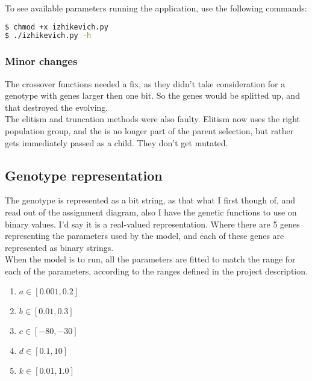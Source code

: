 To see available parameters running the application, use the following commands:

\begin{lstlisting}[frame=single,caption={Application usage},language=bash] 
$ chmod +x izhikevich.py
$ ./izhikevich.py -h
\end{lstlisting}

\subsubsection{Minor changes}
\label{sec:geneticchanges}

The crossover functions needed a fix, as they didn't take consideration for a genotype with genes larger
then one bit. So the genes would be splitted up, and that destroyed the evolving. \\

The elitism and truncation methods were also faulty. Elitism now uses the right population group, and the
is no longer part of the parent selection, but rather gets immediately passed as a child. They don't get mutated. 


\subsection{Genotype representation}
\label{sec:genotype}

The genotype is represented as a bit string, as that what I first though of, and read out of the assignment 
diagram, also I have the genetic functions to use on binary values. I'd say it is a real-valued representation. 
Where there are 5 genes representing the parameters used by the model, and each of these genes are 
represented as binary strings.  \\ 

When the model is to run, all the parameters are fitted to match the range for each of the parameters, according
to the ranges defined in the project description. 

\begin{enumerate}

	\item $a  \in  [0.001, 0.2] $
	\item $b  \in  [0.01, 0.3] $
	\item $c  \in  [-80, -30] $
	\item $d  \in  [0.1,10] $
	\item $k  \in  [0.01, 1.0] $

\end{enumerate}
 
